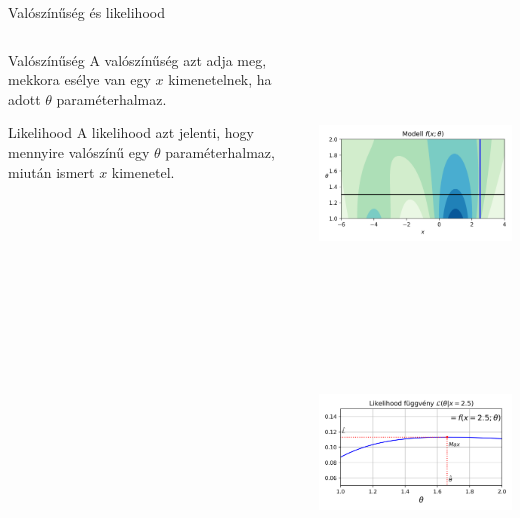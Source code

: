 \documentclass[english, aspectratio=169]{beamer}
\begin{document}
\begin{frame}{Valószínűség és likelihood}
\begin{columns}
\begin{column}{.5\textwidth}
\begin{block}{Valószínűség}
A valószínűség azt adja meg, mekkora esélye van egy $x$ kimenetelnek, ha adott $\theta$ paraméterhalmaz.
\end{block}
\begin{block}{Likelihood}
A likelihood azt jelenti, hogy mennyire valószínű egy $\theta$ paraméterhalmaz, miután ismert $x$ kimenetel. 
\end{block}
\end{column}
\begin{column}{.5\textwidth}
\begin{center}
\includegraphics[width=6cm, height=7cm, keepaspectratio]{images/generative_28.png}
\includegraphics[width=6cm, height=7cm, keepaspectratio]{images/generative_29.png}
\end{center}
\end{column}
\end{columns}
\end{frame}
\end{document}
